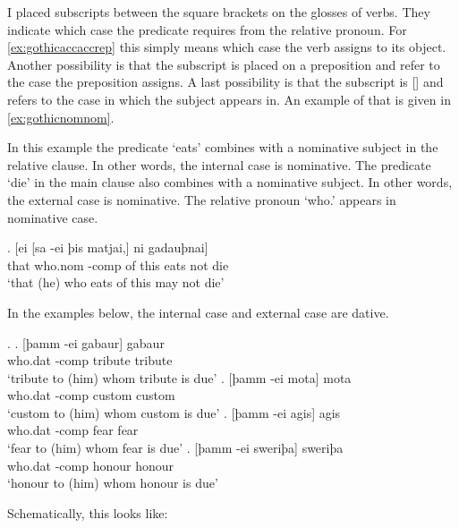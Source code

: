 I placed subscripts between the square brackets on the glosses of verbs. They indicate which case the predicate requires from the relative pronoun. For \ref{ex:gothicaccaccrep} this simply means which case the verb assigns to its object. Another possibility is that the subscript is placed on a preposition and refer to the case the preposition assigns. A last possibility is that the subscript is [] and refers to the case in which the subject appears in. An example of that is given in \ref{ex:gothicnomnom}.

In this example the predicate  `eats' combines with a nominative subject in the relative clause. In other words, the internal case is nominative. The predicate  `die' in the main clause also combines with a nominative subject. In other words, the external case is nominative. The relative pronoun  `who.' appears in nominative case.

\exg. [ei [sa -ei þis matjai,] ni gadauþnai]\\
 that who.\ac{nom} -\ac{comp} {of this} eats\scsub{[nom]} not die\scsub{[nom]}\\
 `that (he) who eats of this may not die' \label{ex:gothicnomnom}

In the examples below, the internal case and external case are dative.

\ex.
\ag. [þamm -ei gabaur] gabaur\\
 who.\ac{dat} -\ac{comp} tribute\scsub{[dat]} tribute\scsub{[dat]}\\
 `tribute to (him) whom tribute is due'
\bg. [þamm -ei mota] mota\\
 who.\ac{dat} -\ac{comp} custom\scsub{[dat]} custom\scsub{[dat]}\\
 `custom to (him) whom custom is due'
\bg. [þamm -ei agis] agis\\
 who.\ac{dat} -\ac{comp} fear\scsub{[dat]} fear\scsub{[dat]}\\
 `fear to (him) whom fear is due'
\bg. [þamm -ei sweriþa] sweriþa\\
 who.\ac{dat} -\ac{comp} honour\scsub{[dat]} honour\scsub{[dat]}\\
 `honour to (him) whom honour is due' \label{ex:gothicdatdat}

Schematically, this looks like:

